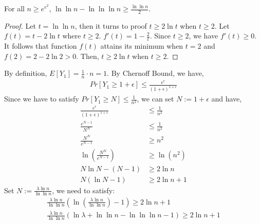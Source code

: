 \begin{claim}\label{1}
    For all $n\ge e^{e^2}$, $\ln \ln n -\ln \ln \ln n \ge \frac{\ln \ln n}{2}$.
\end{claim}
\begin{proof}
    Let $t=\ln \ln n$, then it turns to proof $t\ge 2\ln t$ when $t\ge 2$.
    Let $f(t)=t-2\ln t$ where $t\ge 2$.
    $f'(t)=1-\frac{2}{t}$. Since $t\ge 2$, we have $f'(t)\ge 0$.
    It follows that function $f(t)$ attains its minimum when $t=2$ and $f(2)=2-2\ln 2>0$.
    Then, $t\ge 2\ln t$ when $t\ge 2$.

\end{proof}
\noindent By definition, $E[Y_1]=\frac{1}{n}\cdot n =1$.
By Chernoff Bound, we have,
\begin{align}
    \nonumber Pr[Y_1\ge 1+\epsilon] \le \frac{e^\epsilon}{(1+\epsilon)^{1+\epsilon}}
\end{align}
Since we have to satisfy $Pr[Y_1\ge N] \le \frac{1}{n^2}$, we can set $N:=1+\epsilon$ and have,
\begin{align}
    \nonumber \frac{e^\epsilon}{(1+\epsilon)^{1+\epsilon}}&\le \frac{1}{n^2}\\
    \nonumber \frac{e^{N-1}}{N^N}&\le \frac{1}{n^2}\\
    \nonumber \frac{N^N}{e^{N-1}}&\ge n^2\\
    \nonumber  \ln (\frac{N^N}{e^{N-1}})&\ge \ln (n^2)\\
    \nonumber N \ln N - (N-1) &\ge 2\ln n \\
    \nonumber N(\ln N -1) & \ge 2\ln n +1
\end{align}
Set $N:=\frac{\lambda \ln n}{\ln \ln n}$, we need to satisfy:
\begin{align}
    \nonumber \frac{\lambda \ln n}{\ln \ln n}(\ln (\frac{\lambda \ln n}{\ln \ln n})-1) \ge 2\ln n +1\\
    \nonumber \frac{\lambda \ln n}{\ln \ln n}(\ln \lambda +\ln\ln n -\ln \ln \ln n -1) \ge 2\ln n +1
\end{align}

